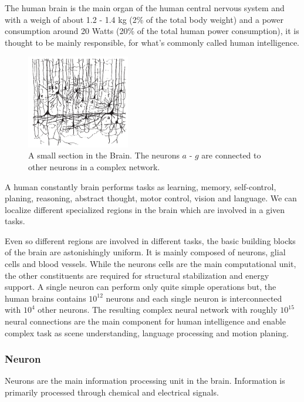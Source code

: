 The human brain is the main organ of the human central nervous system and with a weigh of about 1.2 - 1.4 kg (2\% of the total body weight) and a power consumption around 20 Watts (20\% of the total human power consumption), it is thought to be mainly responsible, for what's commonly called human intelligence.  

\begin{figure}
	\centering
    	\includegraphics[width=0.4\textwidth]{imgs/brain.png} 
    \caption{A small section in the Brain. The neurons $a$ - $g$ are connected to other neurons in a complex network.}
	\label{fig:brain}
\end{figure}

A human constantly brain performs tasks as learning, memory, self-control, planing, reasoning, abstract thought, motor control, vision and language.
We can localize different specialized regions in the brain which are involved in a given tasks. 

Even so different regions are involved in different tasks, the basic building blocks of the brain are astonishingly uniform. 
It is mainly composed of neurons, glial cells and blood vessels.
While the neurons cells are the main computational unit, the other constituents are required for structural stabilization and energy support.
A single neuron can perform only quite simple operations but, the human brains contains $10^{12}$ neurons and each single neuron is interconnected with $10^{4}$ other neurons.
The resulting complex neural network with roughly $10^{15}$ neural connections are the main component for human intelligence and enable complex task as scene understanding, language processing and motion planing.

\subsubsection{Neuron}

Neurons are the main information processing unit in the brain. 
Information is primarily processed through chemical and electrical signals.

